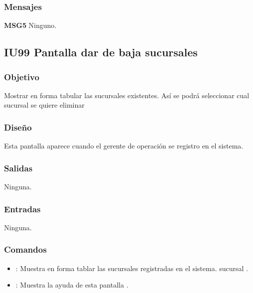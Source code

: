 \subsubsection{Mensajes}
	\begin{Citemize}
		\item {\bf MSG5} Ninguno.
	\end{Citemize}

	
\subsection{IU99 Pantalla dar de baja sucursales}

\subsubsection{Objetivo}
	Mostrar en forma tabular las sucursales existentes. Así se podrá seleccionar cual sucursal se quiere eliminar

\subsubsection{Diseño}
	Esta pantalla aparece cuando el gerente de operación se registro en el sistema.


\subsubsection{Salidas}

	Ninguna.

\subsubsection{Entradas}
	Ninguna.

\subsubsection{Comandos}
\begin{itemize}
	\item {}: Muestra en forma tablar las sucursales registradas en el sistema. sucursal .
	\item {}: Muestra la ayuda de esta pantalla .
\end{itemize}

